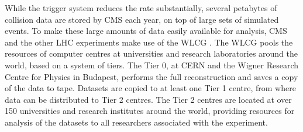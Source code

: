 While the trigger system reduces the rate substantially, several
petabytes of collision data are stored by \ac{CMS} each year, on top
of large sets of simulated events. 
To make these large amounts of data easily available for analysis, 
\ac{CMS} and the other \ac{LHC} experiments make use of the \ac{WLCG} \cite{lhc-wlcg}. 
The \ac{WLCG} pools the resources of computer centres at universities and research
laboratories around the world, based on a system of tiers. The Tier 0, at \ac{CERN} and
the Wigner Research Centre for Physics in Budapest, performs the full reconstruction
and saves a copy of the data to tape. Datasets are copied to at least one Tier 1 centre, from
where data can be distributed to Tier 2 centres. The Tier 2 centres are located
at over 150 universities and research institutes around the world, providing 
resources for analysis of the datasets to all researchers associated with the experiment.



